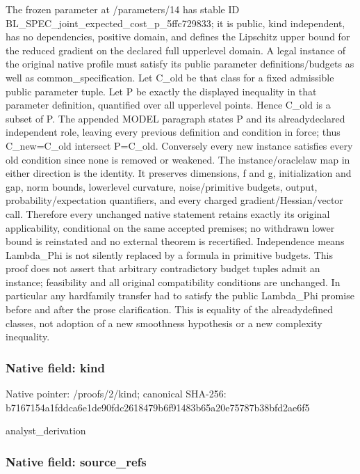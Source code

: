 \documentclass[10pt,a4paper]{article}
\begin{document}
The frozen parameter at /parameters/14 has stable ID BL\_SPEC\_joint\_expected\_c\allowbreak{}ost\_p\_5ffc729833; it is public, kind independent, has no dependencies, positive domain, and defines the Lipschitz upper bound for the reduced gradient on the declared full upperlevel domain. A legal instance of the original native profile must satisfy its public parameter definitions/budgets as well as common\_specification. Let C\_old be that class for a fixed admissible public parameter tuple. Let P be exactly the displayed inequality in that parameter definition, quantified over all upperlevel points. Hence C\_old is a subset of P. The appended MODEL paragraph states P and its alreadydeclared independent role, leaving every previous definition and condition in force; thus C\_new=C\_old intersect P=C\_old. Conversely every new instance satisfies every old condition since none is removed or weakened. The instance/oraclelaw map in either direction is the identity. It preserves dimensions, f and g, initialization and gap, norm bounds, lowerlevel curvature, noise/primitive budgets, output, probability/expectation quantifiers, and every charged gradient/Hessian/vector call. Therefore every unchanged native statement retains exactly its original applicability, conditional on the same accepted premises; no withdrawn lower bound is reinstated and no external theorem is recertified. Independence means Lambda\_Phi is not silently replaced by a formula in primitive budgets. This proof does not assert that arbitrary contradictory budget tuples admit an instance; feasibility and all original compatibility conditions are unchanged. In particular any hardfamily transfer had to satisfy the public Lambda\_Phi promise before and after the prose clarification. This is equality of the alreadydefined classes, not adoption of a new smoothness hypothesis or a new complexity inequality.


\subsubsection{Native field: kind}


Native pointer: /proofs/2/kind; canonical SHA-256: b7167154a1fddca6e1de90fd\allowbreak{}c2618479b6f91483b65a20e7\allowbreak{}5787b38bfd2ae6f5


analyst\_derivation


\subsubsection{Native field: source\_refs}
\end{document}
